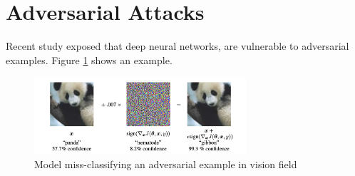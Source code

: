 \section{Adversarial Attacks}

Recent study \textcite{goodfellow2014explaining} exposed that deep neural networks, are vulnerable to adversarial examples. Figure \ref{fig:adv_examples} shows an example.

\begin{figure}[h]
\centering
\includegraphics[width=0.7\textwidth]{images/example.png}
\caption{Model miss-classifying an adversarial example in vision field}
\label{fig:adv_examples}
\end{figure}
